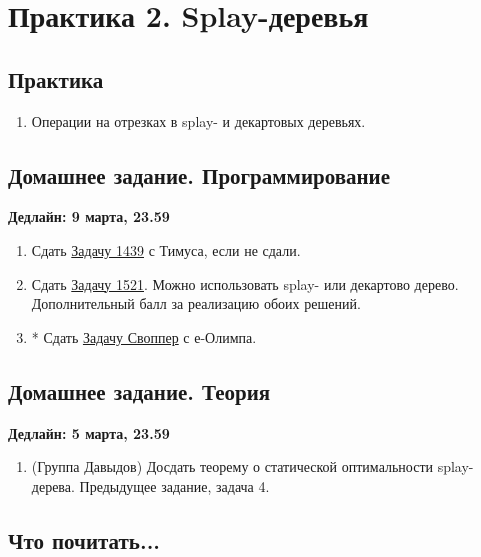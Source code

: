 \section{Практика 2. Splay-деревья}

\subsection{Практика}

\begin{enumerate}

  \item Операции на отрезках в splay- и декартовых деревьях.

\end{enumerate}

\subsection{Домашнее задание. Программирование}
\textbf{Дедлайн: 9 марта, 23.59}

\begin{enumerate}

  \item Сдать \href{http://acm.timus.ru/problem.aspx?space=1&num=1439}
{Задачу 1439} с Тимуса, если не сдали.

  \item Сдать \href{http://acm.timus.ru/problem.aspx?space=1&num=1521}
{Задачу 1521}. Можно использовать splay- или декартово дерево. Дополнительный 
  балл за реализацию обоих решений.

  \item* Сдать \href{http://www.e-olimp.com/problems/689}{Задачу Своппер} с 
е-Олимпа.

\end{enumerate}

\subsection{Домашнее задание. Теория}
\textbf{Дедлайн: 5 марта, 23.59}

\begin{enumerate}

  \item (Группа Давыдов) Досдать теорему о статической оптимальности splay-дерева.
  Предыдущее задание, задача 4.

\end{enumerate}

\subsection{Что почитать...}

